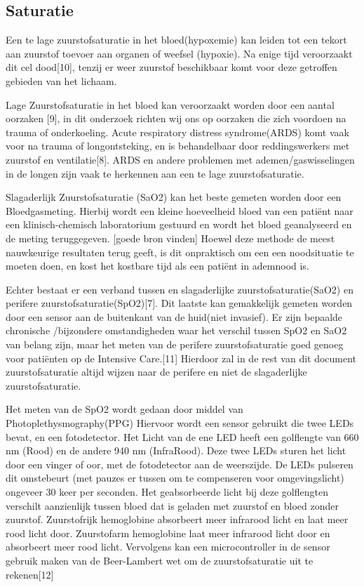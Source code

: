 \documentclass[11pt]{article}
\begin{document}
    \subsection{Saturatie}
    Een te lage zuurstofsaturatie in het bloed(hypoxemie) kan leiden tot een tekort aan zuurstof toevoer aan organen of weefsel (hypoxie).
    Na enige tijd veroorzaakt dit cel dood[10], tenzij er weer zuurstof beschikbaar komt voor deze getroffen gebieden van het lichaam.

    Lage Zuurstofsaturatie in het bloed kan veroorzaakt worden door een aantal oorzaken [9], in dit onderzoek richten wij ons op oorzaken die zich voordoen na trauma of onderkoeling.
    Acute respiratory distress syndrome(ARDS) komt vaak voor na trauma of longontsteking, en is behandelbaar door reddingswerkers met zuurstof en ventilatie[8]. 
    ARDS en andere problemen met ademen/gaswisselingen in de longen zijn vaak te herkennen aan een te lage zuurstofsaturatie.

    Slagaderlijk Zuurstofsaturatie (SaO2) kan het beste gemeten worden door een Bloedgasmeting. 
    Hierbij wordt een kleine hoeveelheid bloed van een patiënt naar een klinisch-chemisch laboratorium gestuurd en wordt het bloed geanalyseerd en de meting teruggegeven. 
    [goede bron vinden] Hoewel deze methode de meest nauwkeurige resultaten terug geeft, is dit onpraktisch om een een noodsituatie  te moeten doen, en kost het kostbare tijd als een patiënt in ademnood is.

    Echter bestaat er een verband tussen en slagaderlijke zuurstofsaturatie(SaO2) en perifere zuurstofsaturatie(SpO2)[7]. 
    Dit laatste kan gemakkelijk gemeten worden door een sensor aan de buitenkant van de huid(niet invasief). 
    Er zijn bepaalde chronische /bijzondere omstandigheden waar het verschil tussen SpO2 en SaO2 van belang zijn, maar het meten van de perifere zuurstofsaturatie goed genoeg voor patiënten op de Intensive Care.[11] 
    Hierdoor zal in de rest van dit document zuurstofsaturatie altijd wijzen naar de perifere en niet de slagaderlijke zuurstofsaturatie.

    Het meten van de SpO2 wordt gedaan door middel van Photoplethysmography(PPG) Hiervoor wordt een sensor gebruikt die twee LEDs bevat, en een fotodetector. 
    Het Licht van de ene LED heeft een golflengte van 660 nm (Rood) en de andere 940 nm (InfraRood). Deze twee LEDs sturen het licht door een vinger of oor, met de fotodetector aan de weerszijde. 
    De LEDs pulseren dit omstebeurt (met pauzes er tussen om te compenseren voor omgevingslicht) ongeveer 30 keer per seconden. 
    Het geabsorbeerde licht bij deze golflengten verschilt aanzienlijk tussen bloed dat is geladen met zuurstof en bloed zonder zuurstof. 
    Zuurstofrijk hemoglobine absorbeert meer infrarood licht en laat meer rood licht door. Zuurstofarm hemoglobine laat meer infrarood licht door en absorbeert meer rood licht. 
    Vervolgens kan een microcontroller in de sensor gebruik maken van de Beer-Lambert wet om de zuurstofsaturatie uit te rekenen[12]
\end{document}
